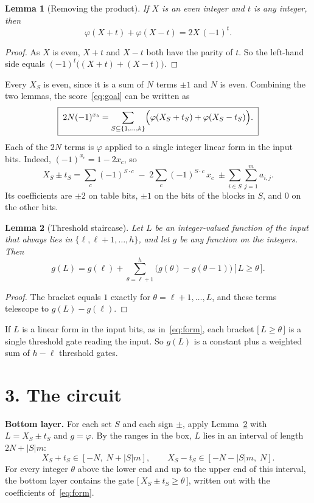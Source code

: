 \documentclass[11pt,letterpaper]{article}
\newtheorem{lemma}{Lemma}
\newcommand{\ind}[1]{\bigl[\,#1\,\bigr]}
\newcommand{\sect}[1]{\section*{\color{ink}#1}}
\newcommand{\smalltitle}[1]{\textbf{\color{ink}#1}\quad}
\begin{document}
\begin{lemma}[Removing the product]\label{lem:parity}
If $X$ is an even integer and $t$ is any integer, then
\[
\varphi(X+t)+\varphi(X-t)=2X\,(-1)^t .
\]
\end{lemma}
\begin{proof}
As $X$ is even, $X+t$ and $X-t$ both have the parity of $t$. So the
left-hand side equals $(-1)^t\bigl((X+t)+(X-t)\bigr)$.
\end{proof}

Every $X_S$ is even, since it is a sum of $N$ terms $\pm1$ and $N$ is even.
Combining the two lemmas, the score~\eqref{eq:goal} can be written as
\begin{equation}\label{eq:score}
\boxed{\;2N(-1)^{x_b}=\sum_{S\subseteq\{1,\dots,k\}}
 \Bigl(\varphi(X_S+t_S)+\varphi(X_S-t_S)\Bigr).\;}
\end{equation}
Each of the $2N$ terms is $\varphi$ applied to a single integer linear form
in the input bits. Indeed, $(-1)^{x_c}=1-2x_c$, so
\begin{equation}\label{eq:form}
X_S\pm t_S=\sum_{c}(-1)^{S\cdot c}
 \;-\;2\sum_{c}(-1)^{S\cdot c}\,x_c
 \;\pm\sum_{i\in S}\sum_{j=1}^{m}a_{i,j}.
\end{equation}
Its coefficients are $\pm2$ on table bits, $\pm1$ on the bits of the blocks
in $S$, and $0$ on the other bits.

\begin{lemma}[Threshold staircase]\label{lem:ladder}
Let $L$ be an integer-valued function of the input that always lies in
$\{\ell,\ell+1,\dots,h\}$, and let $g$ be any function on the integers. Then
\[
g(L)=g(\ell)+\sum_{\theta=\ell+1}^{h}\bigl(g(\theta)-g(\theta-1)\bigr)\,
\ind{L\ge\theta}.
\]
\end{lemma}
\begin{proof}
The bracket equals $1$ exactly for $\theta=\ell+1,\dots,L$, and these terms
telescope to $g(L)-g(\ell)$.
\end{proof}

If $L$ is a linear form in the input bits, as in~\eqref{eq:form}, each
bracket $\ind{L\ge\theta}$ is a single threshold gate reading the input.
So $g(L)$ is a constant plus a weighted sum of $h-\ell$ threshold gates.

\sect{3. The circuit}

\smalltitle{Bottom layer.}
For each set $S$ and each sign $\pm$, apply Lemma~\ref{lem:ladder} with
$L=X_S\pm t_S$ and $g=\varphi$. By the ranges in the box, $L$ lies in an
interval of length $2N+|S|m$:
\[
X_S+t_S\in[-N,\;N+|S|m],\qquad X_S-t_S\in[-N-|S|m,\;N].
\]
For every integer $\theta$ above the lower end and up to the upper end of this
interval, the bottom layer contains the gate $\ind{X_S\pm t_S\ge\theta}$,
written out with the coefficients of~\eqref{eq:form}.
\end{document}
